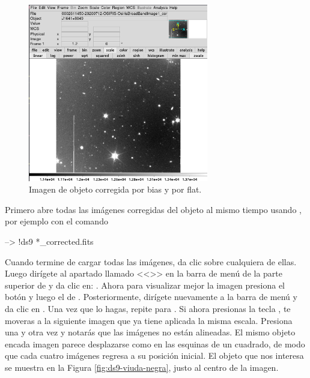 \begin{figure}[htb]
  \centering
	\includegraphics[width=0.7\textwidth]{figures/ds9-object-corrected.png}
	\caption{Imagen de objeto corregida por bias y por flat.}
	\label{fig:object-corrected} 
\end{figure}

Primero abre todas las imágenes corregidas del objeto al mismo tiempo usando , por ejemplo con el comando

\begin{shell}
--> !ds9 *_corrected.fits
\end{shell}

Cuando  termine de cargar todas las imágenes, da clic sobre cualquiera de ellas. Luego dirígete al apartado llamado <<>> en la barra de menú de la parte superior de  y da clic en: . Ahora para visualizar mejor la imagen presiona el botón  y luego el de . Posteriormente, dirígete nuevamente a la barra de menú y da clic en . Una vez que lo hagas, repite para . Si ahora presionas la tecla , te moveras a la siguiente imagen que ya tiene aplicada la misma escala. Presiona  una y otra vez y notarás que las imágenes no están alineadas. El mismo objeto encada imagen parece desplazarse como en las esquinas de un cuadrado, de modo que cada cuatro imágenes regresa a su posición inicial. El objeto que nos interesa se muestra en la Figura \ref{fig:ds9-viuda-negra}, justo al centro de la imagen.

